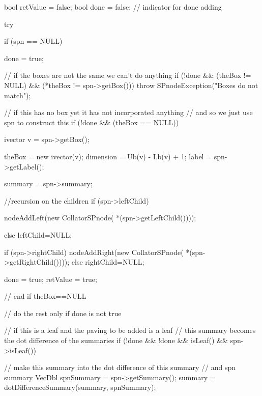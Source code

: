 \begin{DoxyCode}
    {

        bool retValue = false;
        bool done = false;  // indicator for done adding

        try {

            if (spn == NULL) {
                done = true;

            }

            // if the boxes are not the same we can't do anything
            if (!done && (theBox != NULL) && (*theBox != spn->getBox())) {
                throw SPnodeException("Boxes do not match");
            }

            // if this has no box yet it has not incorporated anything
            // and so we just use spn to construct this
            if (!done && (theBox == NULL)) {

                ivector v = spn->getBox();

                theBox = new ivector(v);
                dimension = Ub(v) - Lb(v) + 1;
                label = spn->getLabel();

                summary = spn->summary;

                //recursion on the children
                if (spn->leftChild) {
                    nodeAddLeft(new CollatorSPnode(
                        *(spn->getLeftChild())));

                }
                else leftChild=NULL;

                if (spn->rightChild) {
                    nodeAddRight(new CollatorSPnode(
                        *(spn->getRightChild())));
                 }
                else rightChild=NULL;

                done = true;
                retValue = true;

            } // end if theBox==NULL

            // do the rest only if done is not true

            // if this is a leaf and the paving to be added is a leaf
            // this summary becomes the dot difference of the summaries
            if (!done && !done && isLeaf() && spn->isLeaf()) {

                // make this summary into the dot difference of this summary
                // and spn summary
                VecDbl spnSummary = spn->getSummary();
                summary = dotDifferenceSummary(summary, spnSummary);
            }

}}
\end{DoxyCode}
